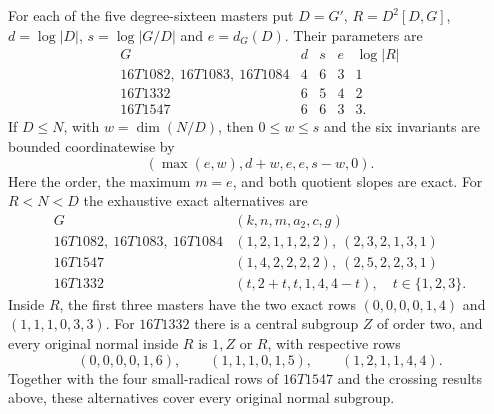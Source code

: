 \begin{lemma}
\label{lem:carrier-normal-branches}
For each of the five degree-sixteen masters put $D=G'$,
$R=D^2[D,G]$, $d=\log|D|$, $s=\log|G/D|$ and $e=d_G(D)$.
Their parameters are
\[
\begin{array}{c|rrrr}
G&d&s&e&\log|R|\\\hline
16T1082,\ 16T1083,\ 16T1084&4&6&3&1\\
16T1332&6&5&4&2\\
16T1547&6&6&3&3.
\end{array}
\]
If $D\leq N$, with $w=\dim(N/D)$, then $0\leq w\leq s$ and
the six invariants are bounded coordinatewise by
\[
 (\max(e,w),d+w,e,e,s-w,0).
\]
Here the order, the maximum $m=e$, and both quotient slopes are exact.
For $R<N<D$ the exhaustive exact alternatives are
\[
\begin{array}{c|l}
G&(k,n,m,a_2,c,g)\\\hline
16T1082,\ 16T1083,\ 16T1084
 &(1,2,1,1,2,2),\ (2,3,2,1,3,1)\\
16T1547 &(1,4,2,2,2,2),\ (2,5,2,2,3,1)\\
16T1332 &(t,2+t,t,1,4,4-t),\quad t\in\{1,2,3\}.
\end{array}
\]
Inside $R$, the first three masters have the two exact rows
$(0,0,0,0,1,4)$ and $(1,1,1,0,3,3)$.
For $16T1332$ there is a central subgroup $Z$ of order two, and every
original normal inside $R$ is $1,Z$ or $R$, with respective rows
\[
 (0,0,0,0,1,6),\qquad(1,1,1,0,1,5),\qquad(1,2,1,1,4,4).
\]
Together with the four small-radical rows of $16T1547$ and the crossing
results above, these alternatives cover every original normal subgroup.
\end{lemma}
